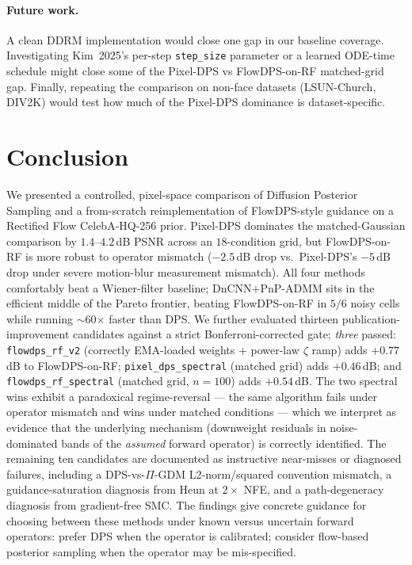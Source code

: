 \documentclass{article}
\begin{document}
\paragraph{Future work.}
A clean DDRM implementation would close one gap in our baseline coverage.
Investigating Kim~2025's per-step \texttt{step\_size} parameter or a
learned ODE-time schedule might close some of the Pixel-DPS vs
FlowDPS-on-RF matched-grid gap. Finally, repeating the comparison on
non-face datasets (LSUN-Church, DIV2K) would test how much of the
Pixel-DPS dominance is dataset-specific.

\section{Conclusion}\label{sec:conclusion}

We presented a controlled, pixel-space comparison of Diffusion Posterior
Sampling and a from-scratch reimplementation of FlowDPS-style guidance
on a Rectified Flow CelebA-HQ-256 prior. Pixel-DPS dominates the
matched-Gaussian comparison by $1.4$--$4.2$\,dB PSNR across an
$18$-condition grid, but FlowDPS-on-RF is more robust to operator
mismatch ($-2.5$\,dB drop vs.\ Pixel-DPS's $-5$\,dB drop under severe
motion-blur measurement mismatch). All four methods comfortably beat a
Wiener-filter baseline; DnCNN$+$PnP-ADMM sits in the efficient middle of
the Pareto frontier, beating FlowDPS-on-RF in $5/6$ noisy cells while
running $\sim$60$\times$ faster than DPS. We further evaluated thirteen
publication-improvement candidates against a strict Bonferroni-corrected
gate; \emph{three} passed: \texttt{flowdps\_rf\_v2} (correctly
EMA-loaded weights $+$ power-law $\zeta$ ramp) adds $+0.77$\,dB to
FlowDPS-on-RF; \texttt{pixel\_dps\_spectral} (matched grid) adds
$+0.46$\,dB; and \texttt{flowdps\_rf\_spectral} (matched grid,
$n{=}100$) adds $+0.54$\,dB. The two spectral wins exhibit a
paradoxical regime-reversal --- the same algorithm fails under
operator mismatch and wins under matched conditions --- which we
interpret as evidence that the underlying mechanism (downweight
residuals in noise-dominated bands of the \emph{assumed} forward
operator) is correctly identified. The remaining ten candidates are
documented as instructive near-misses or diagnosed failures,
including a DPS-vs-$\Pi$-GDM L2-norm/squared convention mismatch, a
guidance-saturation diagnosis from Heun at $2{\times}$ NFE, and a
path-degeneracy diagnosis from gradient-free SMC. The findings give
concrete guidance for choosing between these methods under known
versus uncertain forward operators: prefer DPS when the operator is
calibrated; consider flow-based posterior sampling when the operator
may be mis-specified.
\end{document}

